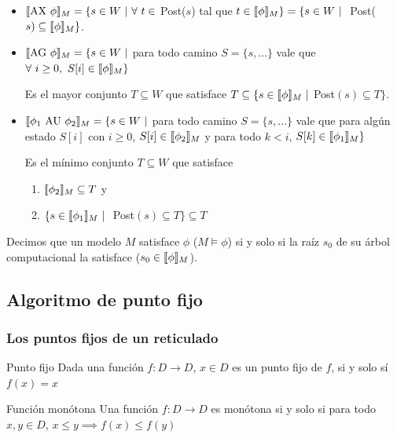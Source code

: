 \begin{itemize}
\item $\llbracket \text{AX }\phi \rrbracket_{M} = \{s\in W~|~\forall~t\in$ Post($s$) tal que $t\in\llbracket \phi \rrbracket_{M}\} = \{ s \in W~|~$ Post($s) \subseteq \llbracket \phi \rrbracket_{M}\}$.
\item $\llbracket \text{AG }\phi \rrbracket_{M} = \{s\in W~|$ para todo camino $S=\{s,\dots\}$ vale que $\forall~i\geq 0,~S[i]\in\llbracket \phi \rrbracket_{M} \}$

Es el mayor conjunto $T\subseteq W$ que satisface $T \subseteq \{ s \in\llbracket \phi \rrbracket_{M}~|$ Post$(s) \subseteq T \}$.

\item $\llbracket \phi_1 \text{ AU }\phi_2 \rrbracket_{M} = \{s\in W~|$ para todo camino $S=\{s,\dots\}$ vale que para algún estado $S[i]$ con $i\geq 0$, $S[i]\in\llbracket \phi_2 \rrbracket_{M}$ y para todo $k < i$, $S[k]\in\llbracket \phi_1 \rrbracket_{M} \}$

Es el mínimo conjunto $T\subseteq W$ que satisface 
\begin{enumerate}
\item $\llbracket \phi_2 \rrbracket_{M} \subseteq T$ y
\item $\{s\in\llbracket \phi_1 \rrbracket_{M} ~|~$ Post$(s)\subseteq T\} \subseteq T$
\end{enumerate}
\end{itemize}


Decimos que un modelo $M$ satisface $\phi$ ($M\vDash \phi$) si y solo si la raíz $s_0$ de su árbol computacional la satisface ($s_0 \in\llbracket \phi \rrbracket_{M}$).

\subsection{Algoritmo de punto fijo}

\subsubsection{Los puntos fijos de un reticulado}
\begin{definicion}{Punto fijo}
Dada una función $f:D\to D$, $x\in D$ es un punto fijo de $f$, si y solo sí $f(x)=x$
\end{definicion}

\begin{definicion}{Función monótona}
Una función $f:D\to D$ es monótona si y solo si para todo $x,y\in D$, $x\leq y \implies f(x) \leq f(y)$
\end{definicion}



